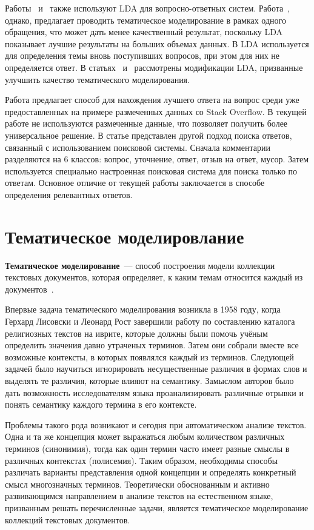 Работы~\cite{LDA1} и~\cite{LDA2} также используют LDA для вопросно-ответных систем. Работа~\cite{LDA1}, однако, предлагает проводить тематическое моделирование в рамках одного обращения, что может дать менее качественный результат, поскольку LDA показывает лучшие результаты на больших объемах данных. В \cite{LDA2} LDA используется для определения темы вновь поступивших вопросов, при этом для них не определяется ответ. В статьях~\cite{TMuse} и~\cite{2016lda} рассмотрены модификации LDA, призванные улучшить качество тематического моделирования.

Работа \cite{so} предлагает способ для нахождения лучшего ответа  на вопрос среди уже предоставленных на примере размеченных данных со Stack Overflow. В текущей работе не используются размеченные данные, что позволяет получить более универсальное решение. В статье \cite{engine} представлен другой подход поиска ответов, связанный с использованием поисковой системы. Сначала комментарии разделяются на 6 классов: вопрос, уточнение, ответ, отзыв на ответ, мусор. Затем используется специально настроенная поисковая система для поиска только по ответам. Основное отличие от текущей работы заключается в способе определения релевантных ответов.

\section{Тематическое моделировлание}
\label{sec:overview_tm}

\textbf{Тематическое моделирование}~--- способ построения модели коллекции текстовых документов, которая определяет, к каким темам относится каждый из документов~\cite{TM}. 

Впервые задача тематического моделирования возникла в 1958 году, когда Герхард Лисовски и Леонард Рост завершили работу по составлению каталога религиозных текстов на иврите, которые должны были помочь учёным определить значения давно утраченых терминов. Затем они собрали вместе все возможные контексты, в которых появлялся каждый из терминов. Следующей задачей было научиться игнорировать несущественные различия в формах слов и выделять те различия, которые влияют на семантику. Замыслом авторов было дать возможность исследователям языка проанализировать различные отрывки и понять семантику каждого термина в его контексте. 

Проблемы такого рода возникают и сегодня при автоматическом анализе текстов. Одна и та же концепция может выражаться любым количеством различных терминов (синонимия), тогда как один термин часто имеет разные смыслы в различных контекстах (полисемия). Таким образом, необходимы способы различать варианты представления одной концепции и определять конкретный смысл многозначных терминов. Теоретически обоснованным и активно развивающимся направлением в анализе текстов на естественном языке, призванным решать перечисленные задачи, является тематическое моделирование коллекций текстовых документов.   

